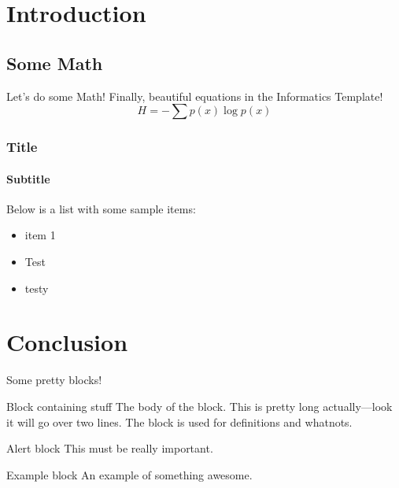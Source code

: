 \documentclass[aspectratio=169]{beamer}
\begin{document}
\section{Introduction}

\subsection{Some Math}

\begin{frame}{Let's do some Math!}
  Finally, beautiful equations in the Informatics Template!
  \begin{equation}
    H = -\sum p(x)\log p(x)
  \end{equation}
\end{frame}

\begin{frame}
  \frametitle{Title}
  \framesubtitle{Subtitle}
  Below is a list with some sample items:
  \begin{itemize}
    \item{item 1}
    \item{Test}
    \item{testy}
  \end{itemize}
\end{frame}

\section{Conclusion}

\begin{frame}{Some pretty blocks!}
  \begin{block}{Block containing stuff}
    The body of the block. This is pretty long actually---look it will go over two lines. The block is used for definitions and whatnots.
  \end{block}
  \begin{alertblock}{Alert block}
    This must be really important.
  \end{alertblock}
  \begin{exampleblock}{Example block}
    An example of something awesome.
  \end{exampleblock}
\end{frame}

\begin{frame}
  \maketitle
\end{frame}
\end{document}
